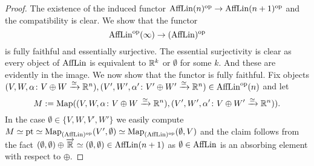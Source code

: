  \begin{proof}
    The existence of the induced functor
    $\operatorname{AffLin}(n)^{\mathrm{op}} \to \operatorname{AffLin}(n+1)^{\mathrm{op}}$ and the compatibility is clear.
    We show that the functor
    \[
     \operatorname{AffLin}^{\mathrm{op}}(\infty) \to ({\operatorname{AffLin}})^{\mathrm{op}}
    \]
    is fully faithful and essentially surjective.
    The essential surjectivity is clear as every object of $\operatorname{AffLin}$ is 
    equivalent to $\mathbb{R}^k$ or $\emptyset$ for some $k$.
    And these are evidently in the image. 
    We now show that the functor is fully faithful.
    Fix objects $(V,W,\alpha \colon V \oplus W \xrightarrow{\simeq} \mathbb{R}^n),
      (V',W',\alpha' \colon V' \oplus W' \xrightarrow{\simeq} \mathbb{R}^n) \in \operatorname{AffLin}^{\mathrm{op}}(n)$ and let
    \[
      M := \operatorname{Map}((V,W,\alpha \colon V \oplus W \xrightarrow{\simeq} \mathbb{R}^{n}),
      (V',W',\alpha' \colon V \oplus W' \xrightarrow{\simeq} \mathbb{R}^{n}))
      .\]
    In the case $\emptyset \in \{V,W,V',W'\}$ we easily compute
    $ M \simeq \mathrm{pt} \simeq \operatorname{Map}_{(\operatorname{AffLin})^{\mathrm{op}}}(V',\emptyset) \simeq
      \operatorname{Map}_{(\operatorname{AffLin})^{\mathrm{op}}}(\emptyset, V)$ and the claim follows from the fact
    $(\emptyset,\emptyset) \oplus \overrightarrow{\mathbb{R}} \simeq
      (\emptyset,\emptyset) \in \operatorname{AffLin}(n+1)$ as $\emptyset \in \operatorname{AffLin}$
    is an absorbing element with respect to $\oplus$.
  

\end{proof}
